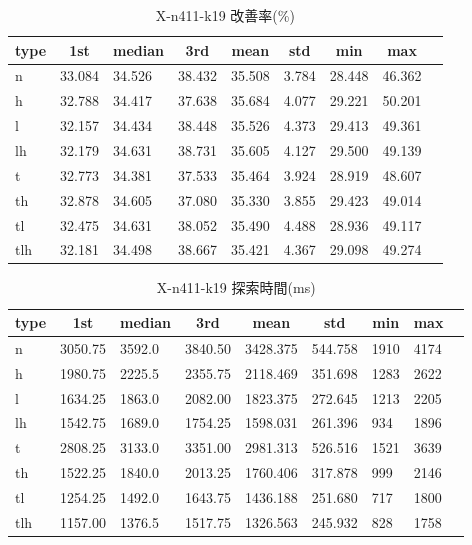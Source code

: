\begin{table}[htbp]
    \centering
    \caption{X-n411-k19 改善率(\%)}
    \begin{tabular}{|l|l|l|l|l|l|l|l|l|}\hline
    \multicolumn{1}{|c|}{\textbf{type}}
    &\multicolumn{1}{|c|}{\textbf{1st}}
    &\multicolumn{1}{c|}{\textbf{median}}
    &\multicolumn{1}{c|}{\textbf{3rd}}
    &\multicolumn{1}{c|}{\textbf{mean}}
    &\multicolumn{1}{c|}{\textbf{std}}
    &\multicolumn{1}{c|}{\textbf{min}}
    &\multicolumn{1}{c|}{\textbf{max}}\\\hline
	n & 33.084 & 34.526 & 38.432 & 35.508 & 3.784 & 28.448 & 46.362\\\hline
	h & 32.788 & 34.417 & 37.638 & 35.684 & 4.077 & 29.221 & 50.201\\\hline
	l & 32.157 & 34.434 & 38.448 & 35.526 & 4.373 & 29.413 & 49.361\\\hline
	lh & 32.179 & 34.631 & 38.731 & 35.605 & 4.127 & 29.500 & 49.139\\\hline
	t & 32.773 & 34.381 & 37.533 & 35.464 & 3.924 & 28.919 & 48.607\\\hline
	th & 32.878 & 34.605 & 37.080 & 35.330 & 3.855 & 29.423 & 49.014\\\hline
	tl & 32.475 & 34.631 & 38.052 & 35.490 & 4.488 & 28.936 & 49.117\\\hline
	tlh & 32.181 & 34.498 & 38.667 & 35.421 & 4.367 & 29.098 & 49.274\\\hline
	\end{tabular}
\end{table}
\begin{table}[htbp]
    \centering
    \caption{X-n411-k19 探索時間(ms)}
    \begin{tabular}{|l|l|l|l|l|l|l|l|l|}\hline
    \multicolumn{1}{|c|}{\textbf{type}}
    &\multicolumn{1}{|c|}{\textbf{1st}}
    &\multicolumn{1}{c|}{\textbf{median}}
    &\multicolumn{1}{c|}{\textbf{3rd}}
    &\multicolumn{1}{c|}{\textbf{mean}}
    &\multicolumn{1}{c|}{\textbf{std}}
    &\multicolumn{1}{c|}{\textbf{min}}
    &\multicolumn{1}{c|}{\textbf{max}}\\\hline
	n & 3050.75 & 3592.0 & 3840.50 & 3428.375 & 544.758 & 1910 & 4174\\\hline
	h & 1980.75 & 2225.5 & 2355.75 & 2118.469 & 351.698 & 1283 & 2622\\\hline
	l & 1634.25 & 1863.0 & 2082.00 & 1823.375 & 272.645 & 1213 & 2205\\\hline
	lh & 1542.75 & 1689.0 & 1754.25 & 1598.031 & 261.396 & 934 & 1896\\\hline
	t & 2808.25 & 3133.0 & 3351.00 & 2981.313 & 526.516 & 1521 & 3639\\\hline
	th & 1522.25 & 1840.0 & 2013.25 & 1760.406 & 317.878 & 999 & 2146\\\hline
	tl & 1254.25 & 1492.0 & 1643.75 & 1436.188 & 251.680 & 717 & 1800\\\hline
	tlh & 1157.00 & 1376.5 & 1517.75 & 1326.563 & 245.932 & 828 & 1758\\\hline
	\end{tabular}
\end{table}
